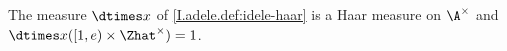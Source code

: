 The measure $\dtimes x$ of \cref{I.adele.def:idele-haar} is a Haar measure on $\A^\times$ and $\dtimes x([1,e)\times\Zhat^\times)=1$.
